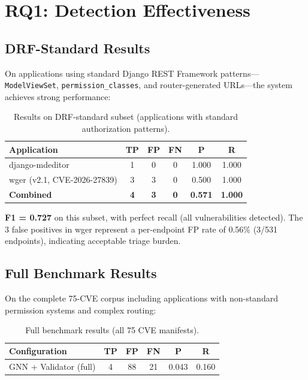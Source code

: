 \section{RQ1: Detection Effectiveness}
\label{sec:rq1}

\subsection{DRF-Standard Results}

On applications using standard Django REST Framework patterns—\texttt{ModelViewSet}, \texttt{permission\_classes}, and router-generated URLs—the system achieves strong performance:

\begin{table}[htbp]
\centering
\caption{Results on DRF-standard subset (applications with standard authorization patterns).}
\label{tab:drf-results}
\begin{tabular}{@{}lccccc@{}}
\toprule
\textbf{Application} & \textbf{TP} & \textbf{FP} & \textbf{FN} & \textbf{P} & \textbf{R} \\
\midrule
django-mdeditor & 1 & 0 & 0 & 1.000 & 1.000 \\
wger (v2.1, CVE-2026-27839) & 3 & 3 & 0 & 0.500 & 1.000 \\
\midrule
\textbf{Combined} & \textbf{4} & \textbf{3} & \textbf{0} & \textbf{0.571} & \textbf{1.000} \\
\bottomrule
\end{tabular}
\end{table}

\noindent\textbf{F1 = 0.727} on this subset, with perfect recall (all vulnerabilities detected). The 3 false positives in wger represent a per-endpoint FP rate of 0.56\% (3/531 endpoints), indicating acceptable triage burden.

\subsection{Full Benchmark Results}

On the complete 75-CVE corpus including applications with non-standard permission systems and complex routing:

\begin{table}[htbp]
\centering
\caption{Full benchmark results (all 75 CVE manifests).}
\label{tab:full-results}
\begin{tabular}{@{}lccccc@{}}
\toprule
\textbf{Configuration} & \textbf{TP} & \textbf{FP} & \textbf{FN} & \textbf{P} & \textbf{R} \\
\midrule
GNN + Validator (full) & 4 & 88 & 21 & 0.043 & 0.160 \\
\bottomrule
\end{tabular}
\end{table}

